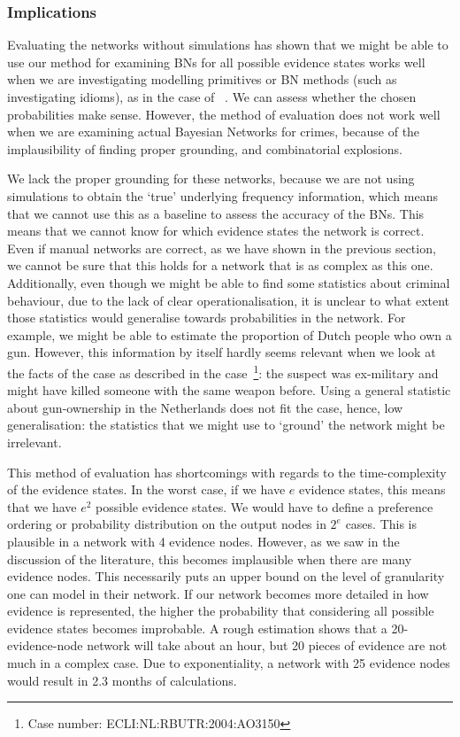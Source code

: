 \documentclass[12pt]{article}
\begin{document}
\subsubsection{Implications}

Evaluating the networks without simulations has shown that we might be able to use our method for examining BNs for all possible evidence states works well when we are investigating modelling primitives or BN methods (such as investigating idioms), as in the case of ~\citep{deZoete2019}. We can assess whether the chosen probabilities make sense. 
However, the method of evaluation does not work well when we are examining actual Bayesian Networks for crimes, because of the implausibility of finding proper grounding, and combinatorial explosions.

We lack the proper grounding for these networks, because we are not using simulations to obtain the `true' underlying frequency information, which means that we cannot use this as a baseline to assess the accuracy of the BNs. This means that we cannot know for which evidence states the network is correct. Even if manual networks are correct, as we have shown in the previous section, we cannot be sure that this holds for a network that is as complex as this one. Additionally, even though we might be able to find some statistics about criminal behaviour, due to the lack of clear operationalisation, it is unclear to what extent those statistics would generalise towards probabilities in the network. For example, we might be able to estimate the proportion of Dutch people who own a gun. However, this information by itself hardly seems relevant when we look at the facts of the case as described in the case~\footnote{Case number: ECLI:NL:RBUTR:2004:AO3150}: the suspect was ex-military and might have killed someone with the same weapon before. Using a general statistic about gun-ownership in the Netherlands does not fit the case, hence, low generalisation: the statistics that we might use to `ground' the network might be irrelevant.

This method of evaluation has shortcomings with regards to the time-complexity of the evidence states. In the worst case, if we have $e$ evidence states, this means that we have $e^2$ possible evidence states. We would have to define a preference ordering or probability distribution on the output nodes in $2^e$ cases. This is plausible in a network with 4 evidence nodes. However, as we saw in the discussion of the literature, this becomes implausible when there are many evidence nodes. 
This necessarily puts an upper bound on the level of granularity one can model in their network. If our network becomes more detailed in how evidence is represented, the higher the probability that considering all possible evidence states becomes improbable. A rough estimation shows that a 20-evidence-node network will take about an hour, but 20 pieces of evidence are not much in a complex case. Due to exponentiality, a network with 25 evidence nodes would result in 2.3 months of calculations.
\end{document}
